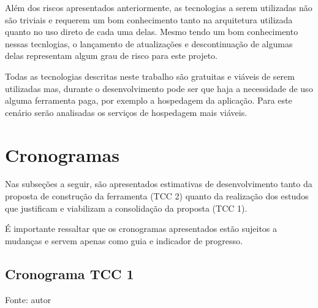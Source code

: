 Além dos riscos apresentados anteriormente, as tecnologias a serem utilizadas não são triviais e requerem um bom conhecimento tanto na arquitetura utilizada
quanto no uso direto de cada uma delas. Mesmo tendo um bom conhecimento nessas tecnlogias, o lançamento de atualizações e descontinuação de algumas delas representam
algum grau de risco para este projeto.

Todas as tecnologias descritas neste trabalho são gratuitas e viáveis de serem utilizadas mas, durante o desenvolvimento pode ser que haja a 
necessidade de uso alguma ferramenta paga, por exemplo a hospedagem da aplicação. Para este cenário serão analisadas os serviços de hospedagem mais
viáveis.

 
\chapter{Cronogramas}
Nas subseções a seguir, são apresentados estimativas de desenvolvimento tanto da proposta de construção da ferramenta (TCC 2) quanto da 
realização dos estudos que justificam e viabilizam a consolidação da proposta (TCC 1). 

É importante ressaltar que os cronogramas apresentados estão sujeitos a mudanças e servem apenas como guia e indicador de progresso.

\section{Cronograma TCC 1}


\begin{table}[h]
	\centering
	\caption{Cronograma TCC 1.}
	\label{perfil}
	Fonte: autor
\end{table}


